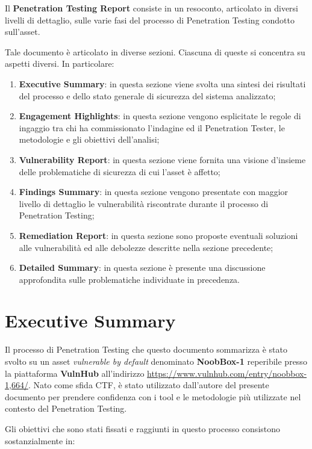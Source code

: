 \documentclass[a4paper, 12pt, oneside]{article}
\begin{document}
Il \textbf{Penetration Testing Report} consiste in un resoconto, articolato in diversi livelli di dettaglio, sulle varie fasi del processo di Penetration Testing condotto sull'asset.

Tale documento è articolato in diverse sezioni. Ciascuna di queste si concentra su aspetti diversi. In particolare:

\begin{enumerate}
    \item \textbf{Executive Summary}: in questa sezione viene svolta una sintesi dei risultati del processo e dello stato generale di sicurezza del sistema analizzato;
    \item \textbf{Engagement Highlights}: in questa sezione vengono esplicitate le regole di ingaggio tra chi ha commissionato l'indagine ed il Penetration Tester, le metodologie e gli obiettivi dell'analisi;
    \item \textbf{Vulnerability Report}: in questa sezione viene fornita una visione d'insieme delle problematiche di sicurezza di cui l'asset è affetto;
    \item \textbf{Findings Summary}: in questa sezione vengono presentate con maggior livello di dettaglio le vulnerabilità riscontrate durante il processo di Penetration Testing;
    \item \textbf{Remediation Report}: in questa sezione sono proposte eventuali soluzioni alle vulnerabilità ed alle debolezze descritte nella sezione precedente;
    \item \textbf{Detailed Summary}: in questa sezione è presente una discussione approfondita sulle problematiche individuate in precedenza.
\end{enumerate}

\newpage
\section{Executive Summary}
Il processo di Penetration Testing che questo documento sommarizza è stato svolto su un asset \textit{vulnerable by default} denominato \textbf{NoobBox-1} reperibile presso la piattaforma \textbf{VulnHub} all'indirizzo \url{https://www.vulnhub.com/entry/noobbox-1,664/}. Nato come sfida CTF, è stato utilizzato dall'autore del presente documento per prendere confidenza con i tool e le metodologie più utilizzate nel contesto del Penetration Testing.

Gli obiettivi che sono stati fissati e raggiunti in questo processo consistono sostanzialmente in:
\end{document}
